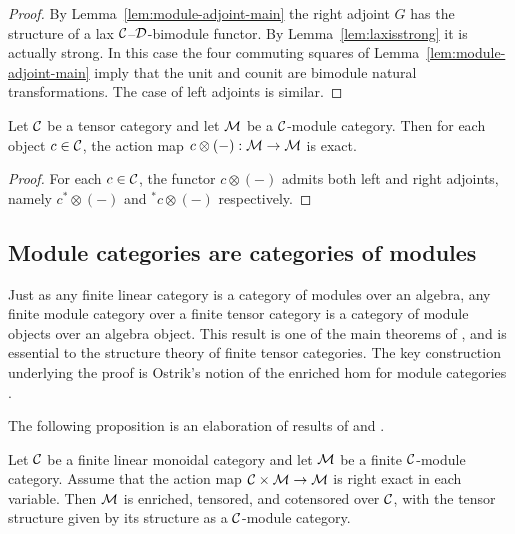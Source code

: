 \documentclass{amsart}
\begin{document}
\begin{proof}
	By Lemma~\ref{lem:module-adjoint-main} the right adjoint $G$ has the structure of a lax $\mathcal C$--$\mathcal D$-bimodule functor. By Lemma~\ref{lem:laxisstrong} it is actually strong. In this case the four commuting squares of Lemma~\ref{lem:module-adjoint-main} imply that the unit and counit are bimodule natural transformations. The case of left adjoints is similar. 
\end{proof}



 




\begin{lemma}\label{lem:partially_exact_action} \cite[Prop. 1.13.1]{EGNO} \cite[Prop. 2.1.8]{MR1797619}
	Let $\mathcal C$ be a tensor category and let $\mathcal M$ be a $\mathcal C$-module category. Then for each object $c \in \mathcal C$, the action map $c \otimes (-): \mathcal M \to \mathcal M$ is exact. 
\end{lemma}

\begin{proof}
	For each $c \in \mathcal C$, the functor $c \otimes (-)$ admits both left and right adjoints, namely $c^* \otimes (-)$ and ${}^*c \otimes (-)$ respectively. 
\end{proof}



\subsection{Module categories are categories of modules}


Just as any finite linear category is a category of modules over an algebra, any finite module category over a finite tensor category is a category of module objects over an algebra object.  This result is one of the main theorems of \cite{EGNO}, and is essential to the structure theory of finite tensor categories.  The key construction underlying the proof is Ostrik's notion of the enriched hom for module categories \cite{MR1976459}.  

The following proposition is an elaboration of results of \cite{MR1976459} and \cite{EO-ftc}. %
\begin{proposition} \label{thm:enrichment-of-mod-cats}
	Let $\mathcal C$ be a finite linear monoidal category and let $\mathcal M$ be a finite $\mathcal C$-module category. Assume that the action map $\mathcal C \times \mathcal M \to \mathcal M$ is right exact in each variable. 
		Then $\mathcal M$ is enriched, tensored, and cotensored over $\mathcal C$, with the tensor structure given by its structure as a $\mathcal C$-module category. 
\end{proposition}
\end{document}
